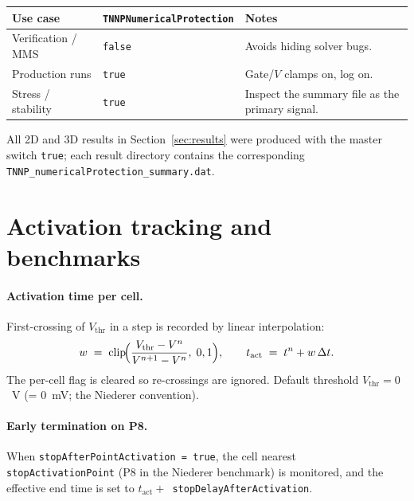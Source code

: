 \documentclass[11pt,a4paper]{article}
\newcommand{\code}[1]{\texttt{\small #1}}
\begin{document}
\begin{center}
\begin{tabular}{@{}lll@{}}
\toprule
Use case & \code{TNNPNumericalProtection} & Notes \\
\midrule
Verification / MMS    & \code{false} & Avoids hiding solver bugs. \\
Production runs       & \code{true}  & Gate/$V$ clamps on, log on. \\
Stress / stability    & \code{true}  & Inspect the summary file
                                       as the primary signal. \\
\bottomrule
\end{tabular}
\end{center}

All 2D and 3D results in Section~\ref{sec:results} were produced
with the master switch \code{true}; each result directory contains
the corresponding \code{TNNP\_numericalProtection\_summary.dat}.

\section{Activation tracking and benchmarks}
\label{sec:activation}

\paragraph{Activation time per cell.} First-crossing of $V_{\text{thr}}$
in a step is recorded by linear interpolation:
\begin{equation}
  w \;=\; \mathrm{clip}\!\Bigl(
      \frac{V_{\text{thr}} - V^{n}}{V^{n+1} - V^{n}},
      \; 0, 1
    \Bigr),
   \qquad
   t_{\text{act}} \;=\; t^{n} + w\, \Delta t.
\end{equation}
The per-cell flag is cleared so re-crossings are ignored.
Default threshold $V_{\text{thr}} = 0$~V (= 0~mV; the Niederer
convention).

\paragraph{Early termination on P8.} When
\code{stopAfterPointActivation = true}, the cell nearest
\code{stopActivationPoint} (P8 in the Niederer benchmark) is
monitored, and the effective end time is set to
$t_{\text{act}} + $~\code{stopDelayAfterActivation}.
\end{document}
